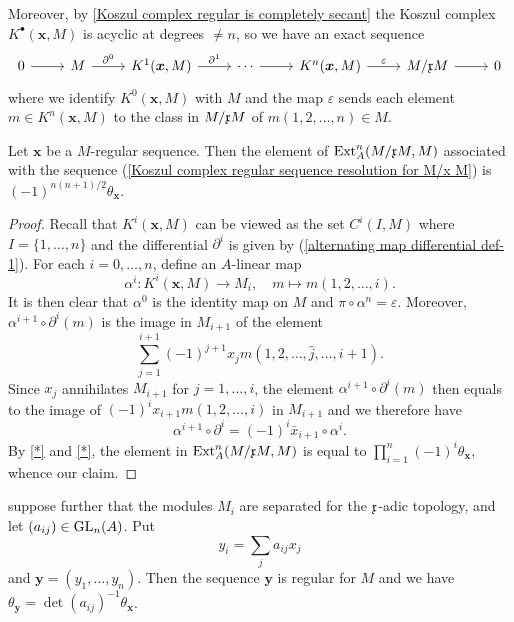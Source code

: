 Moreover, by \cref{Koszul complex regular is completely secant} the Koszul complex $K^\bullet(\bm{x},M)$ is acyclic at degrees $\neq n$, so we have an exact sequence
\begin{equation}\label{Koszul complex regular sequence resolution for M/x M}
\begin{tikzcd}
0\ar[r]&M\ar[r,"\partial^0"]&K^1(\bm{x},M)\ar[r,"\partial^1"]&\cdots\ar[r]&K^n(\bm{x},M)\ar[r,"\varepsilon"]&M/\x M\ar[r]&0
\end{tikzcd}
\end{equation}
where we identify $K^0(\bm{x},M)$ with $M$ and the map $\varepsilon$ sends each element $m\in K^n(\bm{x},M)$ to the class in $M/\mathfrak{x} M$ of $m(1,2,\dots,n)\in M$.
\begin{proposition}\label{Koszul complex regular sequence extension class relation}
Let $\bm{x}$ be a $M$-regular sequence. Then the element of $\mathrm{Ext}_A^n(M/\mathfrak{x} M,M)$ associated with the sequence (\ref{Koszul complex regular sequence resolution for M/x M}) is $(-1)^{n(n+1)/2}\theta_{\bm{x}}$.
\end{proposition}
\begin{proof}
Recall that $K^i(\bm{x},M)$ can be viewed as the set $C^i(I,M)$ where $I=\{1,\dots,n\}$ and the differential $\partial^i$ is given by (\ref{alternating map differential def-1}). For each $i=0,\dots,n$, define an $A$-linear map
\[\alpha^i:K^i(\bm{x},M)\to M_i,\quad m\mapsto m(1,2,\dots,i).\]
It is then clear that $\alpha^0$ is the identity map on $M$ and $\pi\circ\alpha^n=\varepsilon$. Moreover, $\alpha^{i+1}\circ\partial^i(m)$ is the image in $M_{i+1}$ of the element
\[\sum_{j=1}^{i+1}(-1)^{j+1}x_jm(1,2,\dots,\widehat{j},\dots,i+1).\]
Since $x_j$ annihilates $M_{i+1}$ for $j=1,\dots,i$, the element $\alpha^{i+1}\circ\partial^i(m)$ then equals to the image of $(-1)^ix_{i+1}m(1,2,\dots,i)$ in $M_{i+1}$ and we therefore have
\[\alpha^{i+1}\circ\partial^i=(-1)^i\bar{x}_{i+1}\circ\alpha^i.\]
By \cref{*} and \cref{*}, the element in $\mathrm{Ext}_A^n(M/\mathfrak{x} M,M)$ is equal to $\prod_{i=1}^{n}(-1)^i\theta_{\bm{x}}$, whence our claim. 
\end{proof}
\begin{corollary}\label{Koszul complex regular sequence extension class and GL}
suppose further that the modules $M_i$ are separated for the $\mathfrak{x}$-adic topology, and let $(a_{ij})\in\mathrm{GL}_n(A)$. Put
\[y_i=\sum_ja_{ij}x_j\]
and $\bm{y}=(y_1,\dots,y_n)$. Then the sequence $\bm{y}$ is regular for $M$ and we have $\theta_{\bm{y}}=\det(a_{ij})^{-1}\theta_{\bm{x}}$.
\end{corollary}
